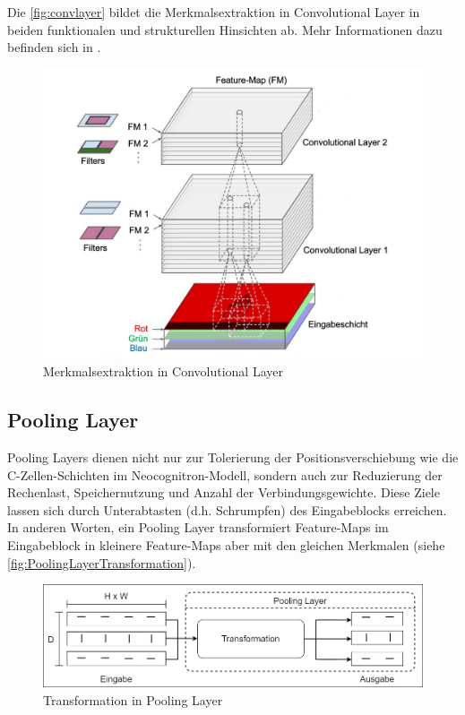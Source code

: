 Die \autoref{fig:convlayer} bildet die Merkmalsextraktion in Convolutional Layer in beiden funktionalen und strukturellen Hinsichten ab. Mehr Informationen dazu befinden sich in \cite{10.5555/3378999}.

\begin{figure}[h]
		\centering
		\includegraphics[width=\linewidth]{images/convolutionalLayer}
		\caption{Merkmalsextraktion in Convolutional Layer  \protect\cite{convlayer}}
		\label{fig:convlayer}
\end{figure}
	

\subsection{Pooling Layer}
	
Pooling Layers dienen nicht nur zur Tolerierung der Positionsverschiebung wie die C-Zellen-Schichten im Neocognitron-Modell, sondern auch zur Reduzierung der Rechenlast, Speichernutzung und Anzahl der Verbindungsgewichte. Diese Ziele lassen sich durch Unterabtasten (d.h. Schrumpfen) des Eingabeblocks erreichen. In anderen Worten, ein Pooling Layer transformiert Feature-Maps im Eingabeblock in kleinere Feature-Maps aber mit den gleichen Merkmalen (siehe \autoref{fig:PoolingLayerTransformation}).
	
\begin{figure}[!hb]
	\centering
	\includegraphics[width=\linewidth]{images/PoolingLayerTransformation}
	\caption{Transformation in Pooling Layer}
	\label{fig:PoolingLayerTransformation}
\end{figure}


